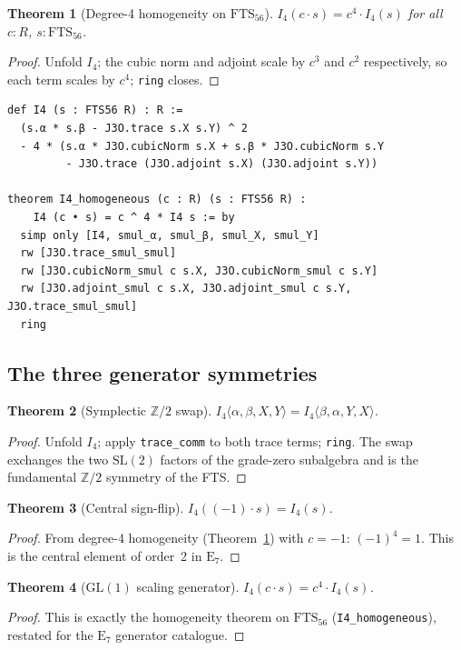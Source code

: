 \documentclass[11pt]{article}
\newtheorem{theorem}{Theorem}[section]
\theoremstyle{definition}
\newcommand{\Iq}{I_4}
\newcommand{\FTS}{\mathrm{FTS}_{56}}
\newcommand{\Eseven}{\mathrm{E}_7}
\begin{document}
\begin{theorem}[Degree-4 homogeneity on $\FTS$]\label{thm:hom}
$\Iq(c\cdot s)=c^{4}\cdot\Iq(s)$ for all $c:R$, $s:\FTS$.
\end{theorem}
\begin{proof}
Unfold $\Iq$; the cubic norm and adjoint scale by $c^3$ and $c^2$
respectively, so each term scales by $c^4$; \texttt{ring} closes.
\end{proof}

\begin{lstlisting}[language=leanL,caption={I4 and its homogeneity
  (GKN\_I4\_State56\_CommRing.lean).}]
def I4 (s : FTS56 R) : R :=
  (s.α * s.β - J3O.trace s.X s.Y) ^ 2
  - 4 * (s.α * J3O.cubicNorm s.X + s.β * J3O.cubicNorm s.Y
         - J3O.trace (J3O.adjoint s.X) (J3O.adjoint s.Y))

theorem I4_homogeneous (c : R) (s : FTS56 R) :
    I4 (c • s) = c ^ 4 * I4 s := by
  simp only [I4, smul_α, smul_β, smul_X, smul_Y]
  rw [J3O.trace_smul_smul]
  rw [J3O.cubicNorm_smul c s.X, J3O.cubicNorm_smul c s.Y]
  rw [J3O.adjoint_smul c s.X, J3O.adjoint_smul c s.Y, J3O.trace_smul_smul]
  ring
\end{lstlisting}

\subsection{The three generator symmetries}
\label{sec:fts56-sym}

\begin{theorem}[Symplectic $\mathbb{Z}/2$ swap]\label{thm:swap}
$\Iq\langle\alpha,\beta,X,Y\rangle=\Iq\langle\beta,\alpha,Y,X\rangle$.
\end{theorem}
\begin{proof}
Unfold $\Iq$; apply \texttt{trace\_comm} to both trace terms; \texttt{ring}.
The swap exchanges the two $\mathrm{SL}(2)$ factors of the grade-zero
subalgebra and is the fundamental $\mathbb{Z}/2$ symmetry of the FTS.
\end{proof}

\begin{theorem}[Central sign-flip]\label{thm:neg}
$\Iq((-1)\cdot s)=\Iq(s)$.
\end{theorem}
\begin{proof}
From degree-4 homogeneity (Theorem~\ref{thm:hom}) with $c=-1$: $(-1)^4=1$.
This is the central element of order~2 in $\Eseven$.
\end{proof}

\begin{theorem}[$\mathrm{GL}(1)$ scaling generator]\label{thm:gl1}
$\Iq(c\cdot s)=c^{4}\cdot\Iq(s)$.
\end{theorem}
\begin{proof}
This is exactly the homogeneity theorem on $\FTS$ (\texttt{I4\_homogeneous}),
restated for the $\mathrm{E}_7$ generator catalogue.
\end{proof}
\end{document}
